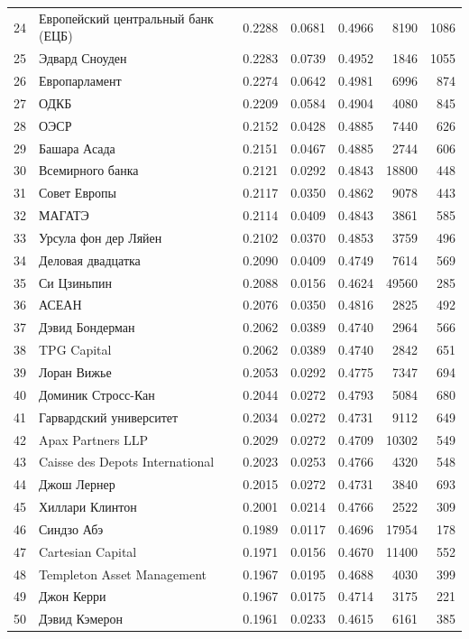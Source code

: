 {\begin{longtable}{r >{\raggedright\arraybackslash}p{4.2cm} S[table-format=1.4] S[table-format=1.4] S[table-format=1.4] r r}
24 & Европейский центральный банк (ЕЦБ) & 0.2288 & 0.0681 & 0.4966 & 8190 & 1086 \\
25 & Эдвард Сноуден & 0.2283 & 0.0739 & 0.4952 & 1846 & 1055 \\
26 & Европарламент & 0.2274 & 0.0642 & 0.4981 & 6996 & 874 \\
27 & ОДКБ & 0.2209 & 0.0584 & 0.4904 & 4080 & 845 \\
28 & ОЭСР & 0.2152 & 0.0428 & 0.4885 & 7440 & 626 \\
29 & Башара Асада & 0.2151 & 0.0467 & 0.4885 & 2744 & 606 \\
30 & Всемирного банка & 0.2121 & 0.0292 & 0.4843 & 18800 & 448 \\
31 & Совет Европы & 0.2117 & 0.0350 & 0.4862 & 9078 & 443 \\
32 & МАГАТЭ & 0.2114 & 0.0409 & 0.4843 & 3861 & 585 \\
33 & Урсула фон дер Ляйен & 0.2102 & 0.0370 & 0.4853 & 3759 & 496 \\
34 & Деловая двадцатка & 0.2090 & 0.0409 & 0.4749 & 7614 & 569 \\
35 & Си Цзиньпин & 0.2088 & 0.0156 & 0.4624 & 49560 & 285 \\
36 & АСЕАН & 0.2076 & 0.0350 & 0.4816 & 2825 & 492 \\
37 & Дэвид Бондерман & 0.2062 & 0.0389 & 0.4740 & 2964 & 566 \\
38 & TPG Capital & 0.2062 & 0.0389 & 0.4740 & 2842 & 651 \\
39 & Лоран Вижье & 0.2053 & 0.0292 & 0.4775 & 7347 & 694 \\
40 & Доминик Стросс-Кан & 0.2044 & 0.0272 & 0.4793 & 5084 & 680 \\
41 & Гарвардский университет & 0.2034 & 0.0272 & 0.4731 & 9112 & 649 \\
42 & Apax Partners LLP & 0.2029 & 0.0272 & 0.4709 & 10302 & 549 \\
43 & Caisse des Depots International & 0.2023 & 0.0253 & 0.4766 & 4320 & 548 \\
44 & Джош Лернер & 0.2015 & 0.0272 & 0.4731 & 3840 & 693 \\
45 & Хиллари Клинтон & 0.2001 & 0.0214 & 0.4766 & 2522 & 309 \\
46 & Синдзо Абэ & 0.1989 & 0.0117 & 0.4696 & 17954 & 178 \\
47 & Cartesian Capital & 0.1971 & 0.0156 & 0.4670 & 11400 & 552 \\
48 & Templeton Asset Management & 0.1967 & 0.0195 & 0.4688 & 4030 & 399 \\
49 & Джон Керри & 0.1967 & 0.0175 & 0.4714 & 3175 & 221 \\
50 & Дэвид Кэмерон & 0.1961 & 0.0233 & 0.4615 & 6161 & 385 \\
\end{longtable}
}


